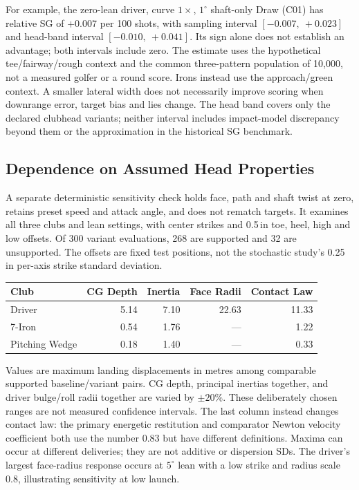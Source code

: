 \documentclass[11pt,letterpaper]{article}
\begin{document}
For example, the zero-lean driver, curve $1\times$, $1^\circ$ shaft-only
Draw (C01) has relative SG of $+0.007$ per 100 shots, with sampling interval
$[-0.007,\ +0.023]$ and head-band interval $[-0.010,\ +0.041]$.
Its sign alone does not establish an advantage; both intervals include zero.
The estimate uses the hypothetical tee/fairway/rough context and the common
three-pattern population of 10,000, not a measured golfer or a round score.
Irons instead use the approach/green context. A smaller lateral width does
not necessarily improve scoring when downrange error, target bias and lies
change. The head band covers only the declared clubhead variants; neither
interval includes impact-model discrepancy beyond them or the approximation
in the historical SG benchmark.

\subsection{Dependence on Assumed Head Properties}
A separate deterministic sensitivity check holds face, path and shaft twist at
zero, retains preset speed and attack angle, and does not rematch targets.
It examines all three clubs and lean settings, with center strikes and
0.5\,in toe, heel, high and low offsets. Of 300 variant evaluations, 268 are
supported and 32 are unsupported. The offsets are fixed test positions,
not the stochastic study's 0.25\,in per-axis strike standard deviation.

\begin{center}
\begin{tabular}{lrrrr}
\toprule
Club & CG Depth & Inertia & Face Radii & Contact Law\\
\midrule
Driver & 5.14 & 7.10 & 22.63 & 11.33\\
7-Iron & 0.54 & 1.76 & --- & 1.22\\
Pitching Wedge & 0.18 & 1.40 & --- & 0.33\\
\bottomrule
\end{tabular}
\end{center}
Values are maximum landing displacements in metres among comparable supported
baseline/variant pairs. CG depth, principal inertias together, and driver
bulge/roll radii together are varied by $\pm20\%$. These deliberately chosen
ranges are not measured confidence intervals. The last column instead changes
contact law: the primary energetic restitution and comparator Newton velocity
coefficient both use the number 0.83 but have different definitions. Maxima
can occur at different deliveries; they are not additive or dispersion SDs.
The driver's largest face-radius response occurs at $5^\circ$ lean with a low
strike and radius scale 0.8, illustrating sensitivity at low launch.
\end{document}
